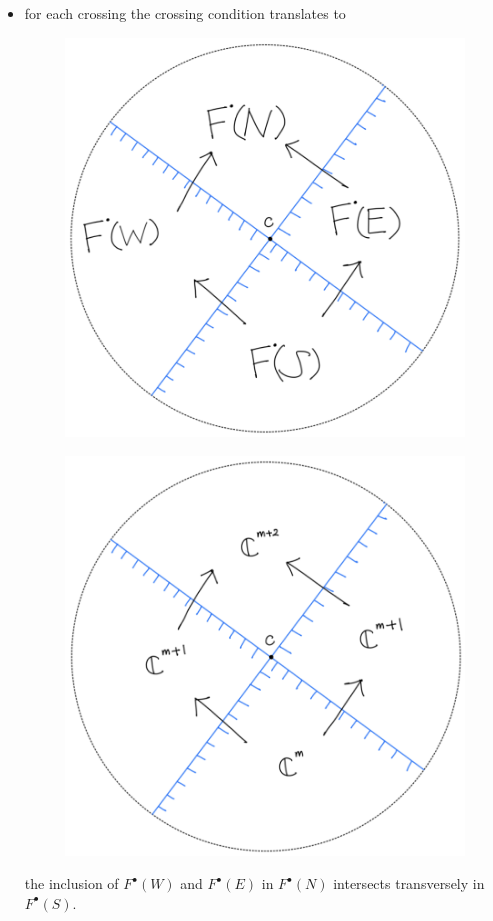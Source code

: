 \begin{itemize}
\item for each crossing the crossing condition translates to
\begin{figure}[H] 
    \centering
    \includegraphics[scale = 0.55]{diagrams/intro/9.png}
    \caption{}
    \label{fig:your-label}
\end{figure}
\begin{figure}[H] 
    \centering
    \includegraphics[scale = 0.55]{diagrams/intro/10.png}
    \caption{}
    \label{fig:your-label}
\end{figure}
the inclusion of $F^\bullet(W)$ and $F^\bullet(E)$ in $F^\bullet(N)$ intersects transversely in $F^\bullet(S)$.
\end{itemize}

